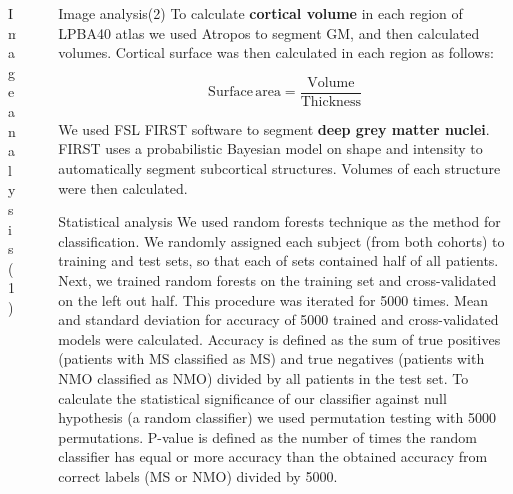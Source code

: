 \documentclass[final]{beamer}
\newlength{\sepwid}
\newlength{\onecolwid}
\newlength{\twocolwid}
\begin{document}
\begin{frame}[t]
\begin{columns}[t]
\begin{column}{\onecolwid}
\begin{block}{Image analysis(1)}
\end{block}



\end{column} %

\begin{column}{\sepwid}\end{column} %

\begin{column}{\twocolwid} %

\begin{columns}[t,totalwidth=\twocolwid] %

\begin{column}{\onecolwid}\vspace{-.6in} %


\begin{block}{Image analysis(2)}
To calculate \textbf{cortical volume} in each region of LPBA40 atlas we used Atropos to segment GM, and then calculated volumes. Cortical surface was then calculated in each region as follows:
 
\begin{equation}
\mathrm{Surface\,area = \frac{Volume}{Thickness}}
\label{eqn:SurfaceEqn}
\end{equation}

We used FSL FIRST software to segment \textbf{deep grey matter nuclei}. FIRST uses a probabilistic Bayesian model on shape and 
intensity to automatically segment subcortical structures. Volumes of each structure were then calculated.
\end{block}

\begin{block}{Statistical analysis}
We used random forests technique as the method for classification. We randomly assigned each subject (from both cohorts) to training and test sets, so that each of sets contained half of all patients. Next, we trained random forests 
on the training set and cross-validated on the left out half. This procedure was iterated for 5000 times. Mean and standard deviation for accuracy of 5000 trained and cross-validated models were calculated. Accuracy is defined as the sum of true 
positives (patients with MS classified as MS) and true negatives (patients with NMO classified as NMO) divided by all patients in the test set. To calculate the statistical significance of our classifier against null hypothesis (a random classifier) we used 
permutation testing with 5000 permutations. P-value is defined 
as the number of times the random classifier has equal or more accuracy than the obtained accuracy from correct labels (MS or NMO) divided by 5000.


\end{block}
\end{column}
\end{columns}
\end{column}
\end{columns}
\end{frame}
\end{document}

